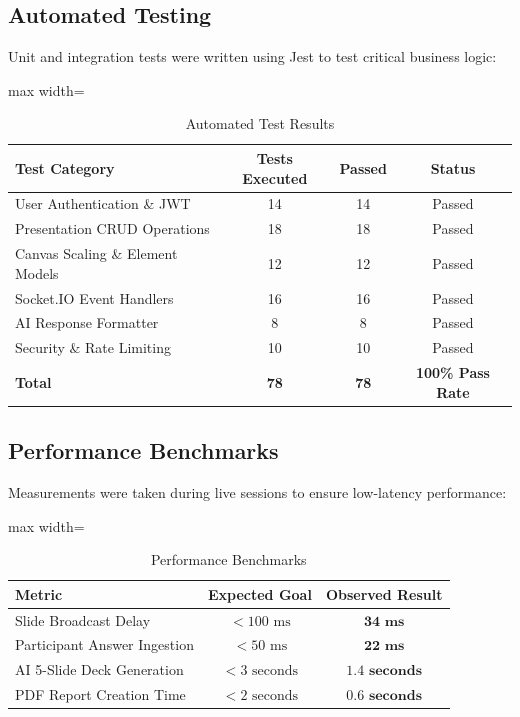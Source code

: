 \subsection{Automated Testing}
Unit and integration tests were written using Jest to test critical business logic:

\begin{table}[H]
\centering
\caption{Automated Test Results}
\label{tab:testresults}
\begin{adjustbox}{max width=\textwidth}
\begin{tabular}{lccc}
\toprule
\textbf{Test Category} & \textbf{Tests Executed} & \textbf{Passed} & \textbf{Status} \\
\midrule
User Authentication \& JWT & 14 & 14 & Passed \\
Presentation CRUD Operations & 18 & 18 & Passed \\
Canvas Scaling \& Element Models & 12 & 12 & Passed \\
Socket.IO Event Handlers & 16 & 16 & Passed \\
AI Response Formatter & 8 & 8 & Passed \\
Security \& Rate Limiting & 10 & 10 & Passed \\
\midrule
\textbf{Total} & \textbf{78} & \textbf{78} & \textbf{100\% Pass Rate} \\
\bottomrule
\end{tabular}
\end{adjustbox}
\end{table}

\subsection{Performance Benchmarks}
Measurements were taken during live sessions to ensure low-latency performance:

\begin{table}[H]
\centering
\caption{Performance Benchmarks}
\label{tab:perfresults}
\begin{adjustbox}{max width=\textwidth}
\begin{tabular}{lcc}
\toprule
\textbf{Metric} & \textbf{Expected Goal} & \textbf{Observed Result} \\
\midrule
Slide Broadcast Delay & $< 100\text{ ms}$ & $\mathbf{34\text{ ms}}$ \\
Participant Answer Ingestion & $< 50\text{ ms}$ & $\mathbf{22\text{ ms}}$ \\
AI 5-Slide Deck Generation & $< 3\text{ seconds}$ & $\mathbf{1.4\text{ seconds}}$ \\
PDF Report Creation Time & $< 2\text{ seconds}$ & $\mathbf{0.6\text{ seconds}}$ \\
\bottomrule
\end{tabular}
\end{adjustbox}
\end{table}

